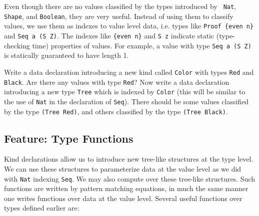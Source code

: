 \documentclass[11pt,twoside,A4]{llncs}
\begin{document}
Even though there are no values classified by the types introduced by {\tt
Nat}, {\tt Shape}, and {\tt Boolean}, they are very useful. Instead of
using them to classify values, we use them as indexes to value level data,
i.e. types like {\tt Proof \{even n\}} and {\tt Seq a (S Z)}. The indexes
like {\tt \{even n\}} and {\tt S z} indicate static (type-checking time)
properties of values. For example, a value with type {\tt Seq a (S Z)} is
statically guaranteed to have length 1.

\begin{exercise}
Write a data declaration introducing a new kind called {\tt Color}
with types {\tt Red} and {\tt Black}. Are there any values with
type {\tt Red}? Now write a data declaration introducing a new
type {\tt Tree} which is indexed by {\tt Color} (this will be
similar to the use of {\tt Nat} in the declaration of {\tt Seq}).
There should be some values classified by the type {\tt (Tree Red)},
and others classified by the type {\tt (Tree Black)}.
\end{exercise}


\subsection{Feature: Type Functions} \label{functions}  Kind declarations allow us to
introduce new tree-like structures at the type level. We can use
these structures to parameterize data at the value level as we did
with {\tt Nat} indexing {\tt Seq}. We may also compute over these tree-like
structures. Such functions are written by pattern matching equations,
in much the same manner one writes functions over data at the value
level. Several useful functions over types defined
earlier are:
\end{document}
